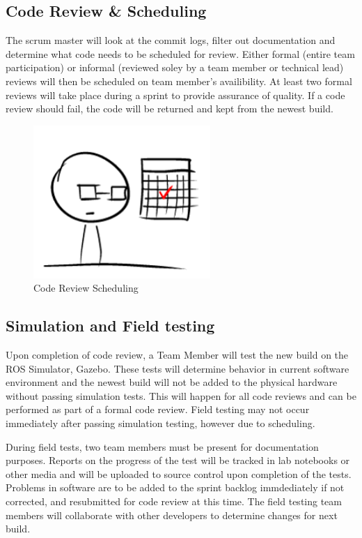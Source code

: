 \subsection{Code Review \& Scheduling}

The scrum master will look at the commit logs, filter out documentation and determine what code needs to be scheduled for review.  Either formal (entire team participation) or informal (reviewed soley by a team member or technical lead) reviews will then be scheduled on team member's availibility.  At least two formal reviews will take place during a sprint to provide assurance of quality.  If a code review should fail, the code will be returned and kept from the newest build.


\begin{figure}[tbh]
\begin{center}
\includegraphics[width=0.6\textwidth]{resources/img/Scheduling}
\end{center}
\caption{Code Review Scheduling \label{systemdiagram}}
\end{figure}


\subsection{Simulation and Field testing}

Upon completion of code review, a Team Member will test the new build on the ROS Simulator, Gazebo.  These tests will determine behavior in current software environment and the newest build will not be added to the physical hardware without passing simulation tests.  This will happen for all code reviews and can be performed as part of a formal code review.  Field testing may not occur immediately after passing simulation testing, however due to scheduling.

During field tests, two team members must be present for documentation purposes.  Reports on the progress of the test will be tracked in lab notebooks or other media and will be uploaded to source control upon completion of the tests.  Problems in software are to be added to the sprint backlog immdediately if not corrected, and resubmitted for code review at this time.  The field testing team members will collaborate with other developers to determine changes for next build.

